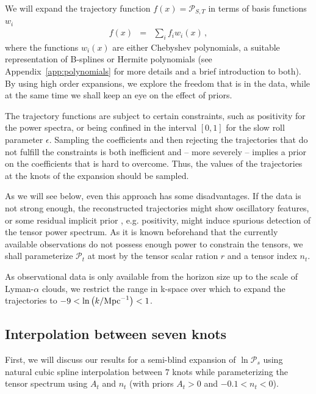 \documentclass[a4paper,11pt]{article}
\newcommand{\pscalar}{{\mathcal{P}_s}}
\newcommand{\ptensor}{{\mathcal{P}_t}}
\begin{document}
We will expand the trajectory function $f(x)=\mathcal{P}_{S,T}$ in
terms of basis functions $w_i$
\begin{eqnarray}
  f(x)&=&\sum_{i} f_i w_i(x)\, ,
\end{eqnarray}
where the functions $w_i(x)$ are either Chebyshev polynomials, a
suitable representation of B-splines or Hermite polynomials (see
Appendix~\ref{app:polynomials} for more details and a brief
introduction to both). By using high order expansions, we explore the
freedom that is in the data, while at the same time we shall keep an
eye on the effect of priors. 


The trajectory functions are subject to certain constraints, such as
positivity for the power spectra, or being confined in the interval
$[0,1]$ for the slow roll parameter $\epsilon$. Sampling the
coefficients and then rejecting the trajectories that do not fulfill
the constraints is both inefficient and -- more severely -- implies a
prior on the coefficients that is hard to overcome. Thus, the values
of the trajectories at the knots of the expansion should be sampled.

As we will see below, even this approach has some disadvantages. If
the data is not strong enough, the reconstructed trajectories might
show oscillatory features, or some residual implicit prior ,
e.g. positivity, might induce spurious detection of the tensor power
spectrum. As it is known beforehand that the currently available
observations do not possess enough power to constrain the tensors, we
shall parameterize $\ptensor$ at most by the tensor scalar ration $r$ and a
tensor index $n_t$.

As observational data is only available from the horizon size up to
the scale of Lyman-$\alpha$ clouds, we restrict the range in k-space over
which to expand the trajectories to $-9<\ln \left(k/{\rm Mpc}^{-1}\right)<1$. 

\subsection{Interpolation between seven knots} \label{sec:7knots}
First, we will discuss our results for a semi-blind expansion of
$\ln \pscalar$ using natural cubic spline interpolation between $7$
knots while parameterizing the tensor spectrum using $A_t$ and $n_t$
(with priors $A_t>0$ and $-0.1<n_t<0$). 
\end{document}
